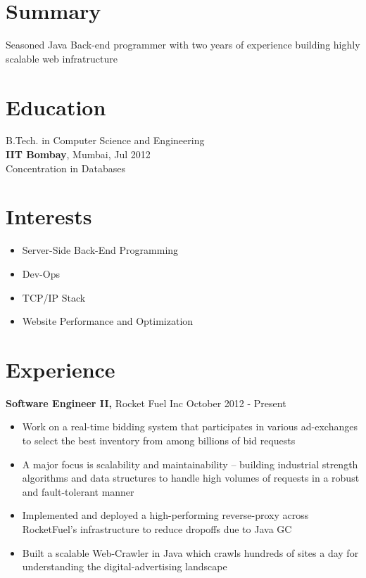 \documentclass[margin]{res}
\begin{document}

\address{ \href{http://ankush.io/}{http://ankush.io} }
\address{ ankush@ankush.io }

\begin{resume}

\section{Summary}
  Seasoned Java Back-end programmer with two years of experience building highly scalable web infratructure
  
\section{Education}
  B.Tech. in Computer Science and Engineering \\
  {\bf IIT Bombay}, Mumbai, Jul 2012 \\
  Concentration in Databases

\section{Interests}
 \begin{itemize} \itemsep -2pt  %
 \item Server-Side Back-End Programming
 \item Dev-Ops
 \item TCP/IP Stack
 \item Website Performance and Optimization
 \end{itemize}
  
\section{Experience}
 {\bf Software Engineer II,} Rocket Fuel Inc \hfill October 2012 - Present
 \begin{itemize} \itemsep -2pt  %
 \item Work on a real-time bidding system that participates in various ad-exchanges to select the best inventory from among billions of bid requests
 \item A major focus is scalability and maintainability -- building industrial strength algorithms and data structures to handle high volumes of requests in a robust and fault-tolerant manner
 \item Implemented and deployed a high-performing reverse-proxy across RocketFuel's infrastructure to reduce dropoffs due to Java GC
 \item Built a scalable Web-Crawler in Java which crawls hundreds of sites a day for understanding the digital-advertising landscape
 \end{itemize}


\end{resume}
\end{document}

